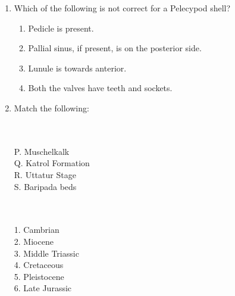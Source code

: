 \documentclass[12pt,fleqn]{article}
\theoremstyle{remark}
\begin{document}
\begin{enumerate}[label=Q.\arabic*.]
    \item Which of the following is not correct for a Pelecypod shell? \hfill{}     
            \begin{enumerate}
                \item Pedicle is present.
                \item Pallial sinus, if present, is on the posterior side.
                \item Lunule is towards anterior.
                \item Both the valves have teeth and sockets.                
            \end{enumerate}          

    \item Match the following: \hfill{} \\
        
        \begin{multicols}{2}
            \\\\
            P. Muschelkalk\\
            Q. Katrol Formation\\
            R. Uttatur Stage\\
            S. Baripada beds

            \columnbreak
            
            \\\\
            1. Cambrian\\
            2. Miocene\\
            3. Middle Triassic\\
            4. Cretaceous\\
            5. Pleistocene\\
            6. Late Jurassic


        \end{multicols}
            \begin {enumerate}
            \end{enumerate}


\end{enumerate}
\end{document}
